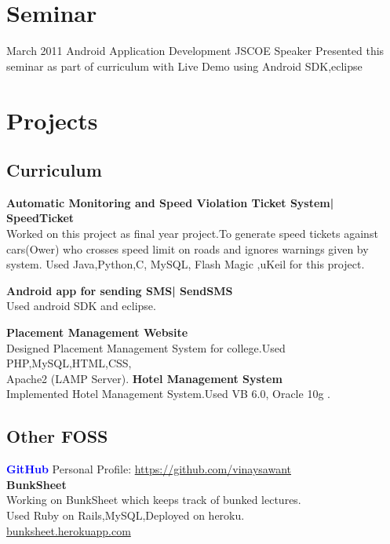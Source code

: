 \documentclass[11pt,a4paper]{moderncv}
\begin{document}

\vspace{.2in}\section{Seminar}
\cventry
{March 2011}
{Android Application Development}
{JSCOE}
{Speaker}
{}
{Presented this seminar as part of curriculum with Live Demo using Android SDK,eclipse}


\vspace{.2in}\section{Projects}
\vspace{.1in}\subsection{Curriculum}
\cvlistitem
{\textbf{Automatic Monitoring and Speed Violation Ticket System| SpeedTicket}  
  \\Worked on this project as final year project.To generate speed tickets against cars(Ower) who crosses speed limit on roads and ignores warnings given by system. Used Java,Python,C, MySQL, Flash Magic ,uKeil for this project.
}

\cvlistitem
{
  \textbf{Android app for sending SMS| SendSMS}
  \\Used android SDK and eclipse.
}

\cvlistitem
{
  \textbf{Placement Management Website }
  \\Designed Placement Management System for college.Used PHP,MySQL,HTML,CSS,
  \\Apache2 (LAMP Server).
}
\cvlistitem
{
  \textbf{Hotel Management System }
  \\Implemented Hotel Management System.Used VB 6.0, Oracle 10g .
}
\vspace{.1in}\subsection{Other FOSS}
\cventry
{\textbf{\textcolor{blue}{GitHub}}}
{Personal Profile: \url{https://github.com/vinaysawant}}
{}{}{}{}\\
\cvlistitem
{
  \textbf{BunkSheet }
  \\Working on BunkSheet which keeps track of bunked lectures.
  \\Used Ruby on Rails,MySQL,Deployed on heroku.
  \\\url{bunksheet.herokuapp.com}
}
\end{document}
